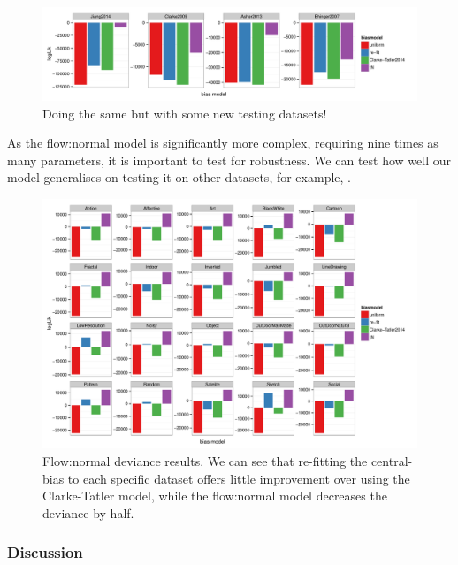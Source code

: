 \begin{figure}
\centering
\includegraphics[width=12cm]{../scripts/flow/figs/llh_testing.pdf}
\caption{Doing the same but with some new testing datasets!}
\label{fig:nFlowDevAll}
\end{figure}
As the flow:normal model is significantly more complex, requiring nine times as many parameters, it is important to test for robustness. We can test how well our model generalises on testing it on other datasets, for example, \cite{borji2015}. 


\begin{figure}
\centering
 \includegraphics[width=12cm]{../scripts/flow/figs/llh_Borji.pdf}
\caption{Flow:normal deviance results. We can see that re-fitting the central-bias to each specific dataset offers little improvement over using the Clarke-Tatler model, while the flow:normal model decreases the deviance by half.}
\label{fig:nFlowDevBorji}
\end{figure}


\subsubsection{Discussion}

